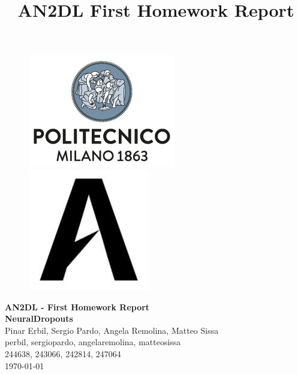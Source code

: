 \documentclass[10pt]{article}
\title{AN2DL First Homework Report}
\begin{document}
    
    \begin{figure}[H]
        \raggedright
        \includegraphics[scale=0.4]{polimi.png} \hfill \includegraphics[scale=0.3]{airlab.jpeg}
    \end{figure}
    
    \vspace{5mm}
    
    \begin{center}
        {\Large \textbf{AN2DL - First Homework Report}}\\
        \vspace{2mm}
        {\Large \textbf{NeuralDropouts}}\\
        \vspace{2mm}
        {\large Pinar Erbil,}
        {\large Sergio Pardo,}
        {\large Angela Remolina,}
        {\large Matteo Sissa}\\
        \vspace{2mm}
        {perbil,}
        {sergiopardo,}
        {angelaremolina,}
        {matteosissa}\\
        \vspace{2mm}
        {244638,}
        {243066,}
        {242814,}
        {247064}\\
        \vspace{5mm}
        \today
    \end{center}    
    \vspace{5mm}
    
\end{document}

